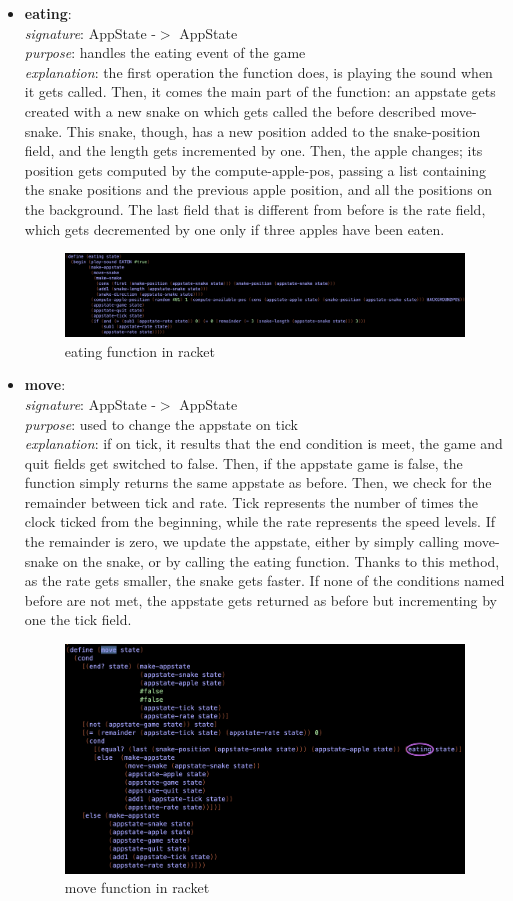 \documentclass{article}
\begin{document}
\begin{itemize}
		\item \textbf{eating}: \\
			\emph{signature}: AppState -$>$ AppState \\
			\emph{purpose}: handles the eating event of the game \\
			\emph{explanation}: the first operation the function does, is playing the sound when it gets called. Then, it comes the main part of the function: an appstate gets created with a new snake on which gets called the before described move-snake. This snake, though, has a new position added to the snake-position field, and the length gets incremented by one. Then, the apple changes; its position gets computed by the compute-apple-pos, passing a list containing the snake positions and the previous apple position, and all the positions on the background. The last field that is different from before is the rate field, which gets decremented by one only if three apples have been eaten.
			\begin{figure}[h!]
				\centering
				\includegraphics[width=.6\linewidth]{eating.png}
				\caption{eating function in racket}
			\end{figure}
			
		\item \textbf{move}: \\
			\emph{signature}: AppState -$>$ AppState \\
			\emph{purpose}: used to change the appstate on tick \\
			\emph{explanation}: if on tick, it results that the end condition is meet, the game and quit fields get switched to false. Then, if the appstate game is false, the function simply returns the same appstate as before. Then, we check for the remainder between tick and rate. Tick represents the number of times the clock ticked from the beginning, while the rate represents the speed levels. If the remainder is zero, we update the appstate, either by simply calling move-snake on the snake, or by calling the eating function. Thanks to this method, as the rate gets smaller, the snake gets faster. If none of the conditions named before are not met, the appstate gets returned as before but incrementing by one the tick field.
			\begin{figure}[h!]
				\centering
				\includegraphics[width=.6\linewidth]{move.png}
				\caption{move function in racket}
			\end{figure}
			

\end{itemize}
\end{document}
